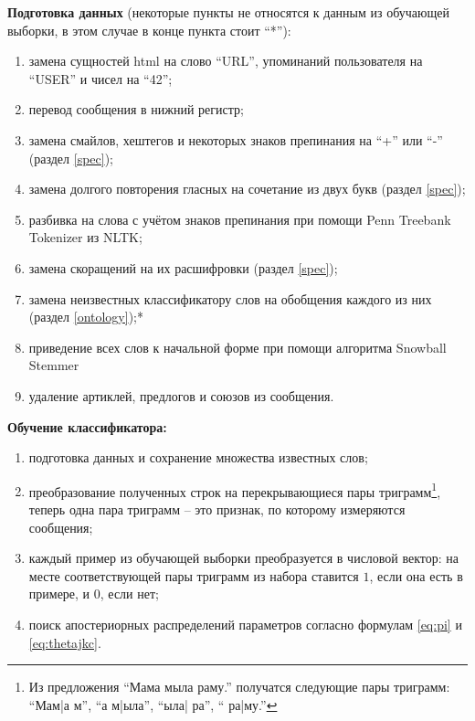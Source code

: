 \textbf{Подготовка данных} (некоторые пункты не относятся к данным из обучающей выборки, в этом
случае в конце пункта стоит ``*''):
\begin{enumerate}
  \item замена сущностей html на слово ``URL'', упоминаний пользователя на ``USER'' и чисел на ``42'';
  \item перевод сообщения в нижний регистр;
  \item замена смайлов, хештегов и некоторых знаков препинания на ``+'' или ``-'' (раздел \ref{spec});
  \item замена долгого повторения гласных на сочетание из двух букв (раздел \ref{spec});
  \item разбивка на слова с учётом знаков препинания при помощи Penn Treebank Tokenizer из NLTK\cite{bird2006nltk};
  \item замена скоращений на их расшифровки (раздел \ref{spec});
  \item замена неизвестных классификатору слов на обобщения каждого из них (раздел \ref{ontology});*
  \item приведение всех слов к начальной форме при помощи алгоритма Snowball
  Stemmer\cite{porter2001snowball}
  \item удаление артиклей, предлогов и союзов из сообщения.
\end{enumerate}

\textbf{Обучение классификатора:}
\begin{enumerate}
\item подготовка данных и сохранение множества известных слов;
\item преобразование полученных строк на перекрывающиеся пары триграмм\footnote{Из предложения
    ``Мама мыла раму.'' получатся следующие пары триграмм: ``Мам|а м'', ``а м|ыла'', ``ыла| ра'', ``
    ра|му.''}, теперь одна пара триграмм -- это признак, по которому измеряются сообщения;
\item каждый пример из обучающей выборки преобразуется в числовой вектор: на месте соответствующей
  пары триграмм из набора ставится $1$, если она есть в примере, и $0$, если нет;
\item поиск апостериорных распределений параметров согласно формулам \ref{eq:pi} и \ref{eq:thetajkc}.
\end{enumerate}

